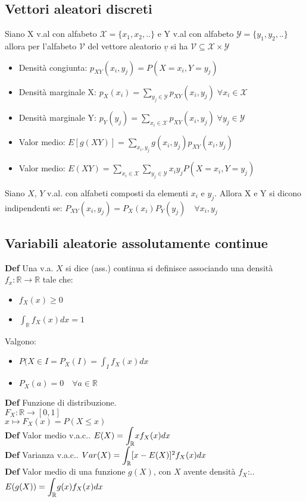 \documentclass[10pt,a4paper]{article}
\begin{document}
\begin{multicols}{2}
\subsection*{Vettori aleatori discreti}
Siano X v.al con alfabeto $\mathcal{X}=\{x_1,x_2,..\}$ e Y v.al con alfabeto $ \mathcal{Y}=\{y_1,y_2,..\}$ allora per l'alfabeto $\mathcal{V}$ del vettore aleatorio $\underline{v}$ si ha $\mathcal{V}\subseteq\mathcal{X}\times\mathcal{Y}$
\begin{itemize}
\item Densità congiunta: $p_{XY}(x_i, y_j) = P(X=x_i, Y=y_j)$
\item Densità marginale X: $p_X(x_i) = \sum\limits_{y_j \in \mathcal{Y}} p_{XY}(x_i,y_j) \; \forall x_i \in \mathcal{X}$
\item Densità marginale Y: $p_Y(y_j) = \sum\limits_{x_i \in \mathcal{X}} p_{XY}(x_i,y_j) \; \forall y_j \in \mathcal{Y}$
\item Valor medio: $E[g(XY)] = \sum\limits_{x_i, y_j} g(x_i, y_j) p_{XY}(x_i, y_j)$
\item Valor medio: $E(XY) = \sum\limits_{x_i \in \mathcal{X}} \sum\limits_{y_j \in \mathcal{Y}} x_i y_j P(X=x_i,Y=y_j)$
\end{itemize}
Siano $X$, $Y$ v.al. con alfabeti composti da elementi $x_i$ e $y_j$. Allora X e Y si dicono indipendenti se: $P_{XY}(x_i, y_j) = P_X(x_i)P_Y(y_j) \quad\forall x_i, y_j$


\subsection*{Variabili aleatorie assolutamente continue}

\textbf{Def}
    Una v.a. $X$ si dice (ass.) continua si definisce associando una densit\`a $f_x : \mathbb{R}\to\mathbb{R}$ tale che:
\begin{itemize}
    \item $f_X(x) \geq 0$
    \item $\int_\mathbb{R} f_X(x) dx = 1$
\end{itemize}
Valgono:
\begin{itemize}
    \item $P(X \in I = P_X(I) = \int_I f_X(x)dx$
    \item $P_X(a) = 0\quad\forall a\in\mathbb{R}$
\end{itemize}
\textbf{Def} Funzione di distribuzione. \\  \textit{
    $F_X : \mathbb{R} \to [0, 1]$ \\
    $x \mapsto F_X(x) = P(X \leq x)$
}\\
\textbf{Def} Valor medio v.a.c.. \textit{
    $E(X) = \mathlarger{\int_\mathbb{R}} x f_X(x)dx$
}\\
\textbf{Def} Varianza v.a.c.. \textit{
    $Var(X) = \mathlarger{\int_\mathbb{R}} [x - E(X)]^2 f_X(x)dx$
}\\
\textbf{Def} Valor medio di una funzione $g(X)$, con $X$ avente densità $f_X$:.. \textit{
    $E(g(X)) = \mathlarger{\int_\mathbb{R}} g(x) f_X(x)dx$
}\\









\end{multicols}
\end{document}
